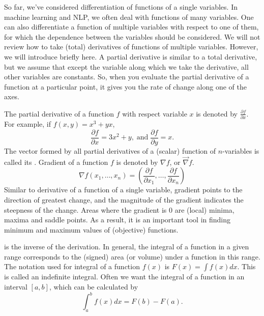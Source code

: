 So far,
we've considered differentiation of functions of a single variables.
In machine learning and NLP,
we often deal with functions of many variables.
One can also differentiate a function of multiple variables with respect to one of them,
for which the dependence between the variables should be considered.
We will not review how to take (total) derivatives
of functions of multiple variables.
However, we will introduce  briefly here.
A partial derivative is similar to a total derivative,
but we assume that except the variable along which we take the derivative,
all other variables are constants.
So, when you evaluate the partial derivative of a function at a particular point,
it gives you the rate of change along one of the axes.

The partial derivative of a function $f$ with respect variable $x$ is denoted by $\frac{\partial f}{\partial x}$.
For example, if $f(x, y) = x^{3} + yx$, 
\[
  \frac{\partial f}{\partial x}  = 3 x^{2} + y,\; \text{and}\; 
  \frac{\partial f}{\partial y}  = x .
\]
The vector formed by all partial derivatives
of a (scalar) function of $n$-variables is called its .
Gradient of a function $f$ is denoted by $\nabla f$, or $\vec{\nabla} f$.
\[
  \nabla f(x_{1}, \ldots, x_{n}) = 
        \left(\frac{\partial f}{\partial x_{1}}, \ldots,
              \frac{\partial f}{\partial x_{n}} \right)
\]
Similar to derivative of a function of a single variable,
gradient points to the direction of greatest change,
and the magnitude of the gradient indicates the steepness of the change.
Areas where the gradient is \num{0} are (local) minima, maxima and saddle points.
As a result, it is an important tool
in finding minimum and maximum values of (objective) functions.



\begin{marginfigure}[-5\baselineskip]
  \caption{\label{fig:integral}%
    Integral of the function $f(x) = 3 x^{2}$ in range $[1, 3]$.
  }
\end{marginfigure}
 is the inverse of the derivation.
In general, the integral of a function in a given range corresponds
to the (signed) area (or volume) under a function in this range.
The notation used for integral of a function $f(x)$ is
$F(x) = \int f(x) dx$.
This is called an indefinite integral.
Often we want the integral of a function in an interval $[a,b]$,
which can be calculated by
\[
  \int_{a}^{b} f(x) dx = F(b) - F(a).
\]

